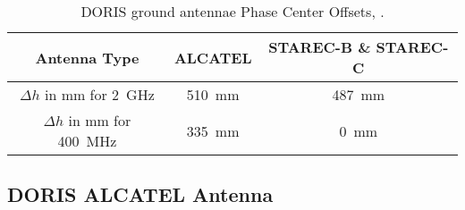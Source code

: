 \begin{table}[h!]
    \centering
    \begin{tabular}{|c|c|c|}
        \hline
        Antenna Type & ALCATEL & STAREC-B \& STAREC-C \\
        \hline
        $\Delta h$ in \si{\mm} for \SI{2}{\GHz} & \SI{510}{\mm} & \SI{487}{\mm}\\
        $\Delta h$ in \si{\mm} for \SI{400}{\MHz} & \SI{335}{\mm} & \SI{0}{\mm}\\
        \hline
    \end{tabular}
    \caption{DORIS ground antennae Phase Center Offsets, \cite{DORISGSM}.}
    \label{table:antenna-pco}
\end{table}

\subsection{DORIS ALCATEL Antenna}

